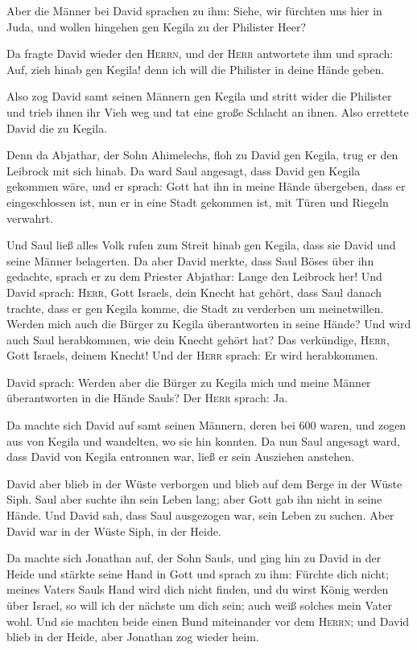  Aber die Männer bei David sprachen zu ihm: Siehe, wir
fürchten uns hier in Juda, und wollen hingehen gen Kegila zu der
Philister Heer?

 Da fragte David wieder den \textsc{Herrn}, und der
\textsc{Herr} antwortete ihm und sprach: Auf, zieh hinab gen Kegila!
denn ich will die Philister in deine Hände geben.

 Also zog David samt seinen Männern gen Kegila und stritt
wider die Philister und trieb ihnen ihr Vieh weg und tat eine große
Schlacht an ihnen. Also errettete David die zu Kegila.

 Denn da Abjathar, der Sohn Ahimelechs, floh zu David gen
Kegila, trug er den Leibrock mit sich hinab.  Da ward Saul
angesagt, dass David gen Kegila gekommen wäre, und er sprach: Gott hat
ihn in meine Hände übergeben, dass er eingeschlossen ist, nun er in eine
Stadt gekommen ist, mit Türen und Riegeln verwahrt.

 Und Saul ließ alles Volk rufen zum Streit hinab gen
Kegila, dass sie David und seine Männer belagerten.  Da
aber David merkte, dass Saul Böses über ihn gedachte, sprach er zu dem
Priester Abjathar: Lange den Leibrock her!  Und David
sprach: \textsc{Herr}, Gott Israels, dein Knecht hat gehört, dass Saul
danach trachte, dass er gen Kegila komme, die Stadt zu verderben um
meinetwillen.  Werden mich auch die Bürger zu Kegila
überantworten in seine Hände? Und wird auch Saul herabkommen, wie dein
Knecht gehört hat? Das verkündige, \textsc{Herr}, Gott Israels, deinem
Knecht! Und der \textsc{Herr} sprach: Er wird herabkommen.

 David sprach: Werden aber die Bürger zu Kegila mich und
meine Männer überantworten in die Hände Sauls? Der \textsc{Herr} sprach:
Ja.

 Da machte sich David auf samt seinen Männern, deren bei
600 waren, und zogen aus von Kegila und wandelten, wo sie hin konnten.
Da nun Saul angesagt ward, dass David von Kegila entronnen war, ließ er
sein Ausziehen anstehen.

 David aber blieb in der Wüste verborgen und blieb auf
dem Berge in der Wüste Siph. Saul aber suchte ihn sein Leben lang; aber
Gott gab ihn nicht in seine Hände.  Und David sah, dass
Saul ausgezogen war, sein Leben zu suchen. Aber David war in der Wüste
Siph, in der Heide.

 Da machte sich Jonathan auf, der Sohn Sauls, und ging
hin zu David in der Heide und stärkte seine Hand in Gott 
und sprach zu ihm: Fürchte dich nicht; meines Vaters Sauls Hand wird
dich nicht finden, und du wirst König werden über Israel, so will ich
der nächste um dich sein; auch weiß solches mein Vater wohl.
 Und sie machten beide einen Bund miteinander vor dem
\textsc{Herrn}; und David blieb in der Heide, aber Jonathan zog wieder
heim.

